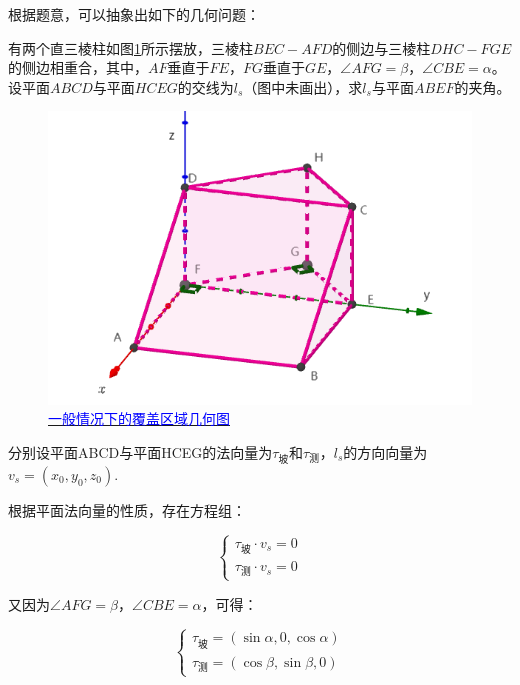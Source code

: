 
根据题意，可以抽象出如下的几何问题：

有两个直三棱柱如图\ref{fig:一般情况下的覆盖区域几何图}所示摆放，三棱柱$BEC-AFD$的侧边与三棱柱$DHC-FGE$的侧边相重合，其中，$AF$垂直于$FE$，$FG$垂直于$GE$，$\angle AFG=\beta$，$\angle CBE=\alpha$。设平面$ABCD$与平面$HCEG$的交线为$l_s$（图中未画出），求$l_s$与平面$ABEF$的夹角。

\begin{figure}[h]
    \centering
    \includegraphics[scale=0.4]{res/img/一般情况下的覆盖区域几何图.png}
    \caption{\href{https://www.geogebra.org/m/absuxwpk}{\textcolor{blue}{一般情况下的覆盖区域几何图}}}
    \label{fig:一般情况下的覆盖区域几何图}
\end{figure}

分别设平面ABCD与平面HCEG的法向量为$\tau_\text{坡}$和$\tau_\text{测}$，$l_s$的方向向量为$v_s = (x_0, y_0, z_0)$.

根据平面法向量的性质，存在方程组：

\begin{equation}
    \begin{cases}
        \tau_\text{坡} \cdot v_s = 0 \\
        \tau_\text{测} \cdot v_s = 0
    \end{cases}
\end{equation}

又因为$\angle AFG=\beta$，$\angle CBE=\alpha$，可得：

\begin{equation}
    \begin{cases}
        \tau_\text{坡} = (\sin\alpha, 0, \cos\alpha) \\
        \tau_\text{测} = (\cos\beta, \sin\beta, 0)
    \end{cases}
\end{equation}

